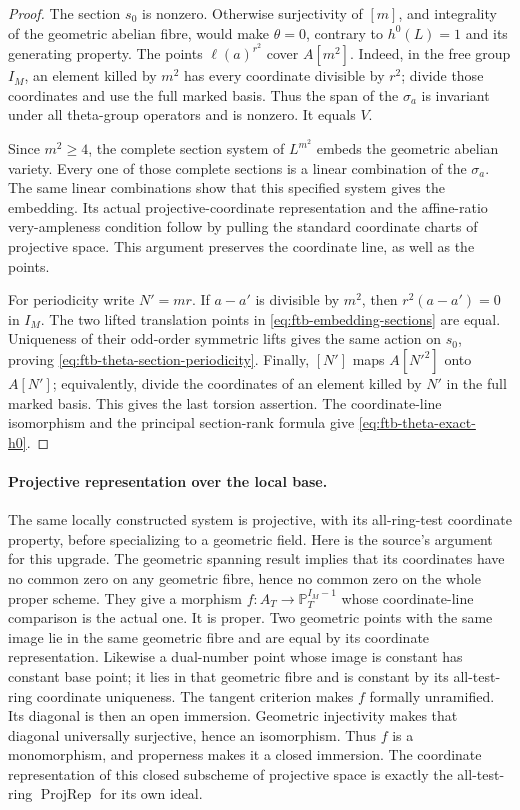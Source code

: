 \begin{proof}
The section \(s_0\) is nonzero.
Otherwise surjectivity of \([m]\), and integrality of
the geometric abelian fibre, would make \(\theta=0\),
contrary to \(h^0(L)=1\) and its generating property.
The points \(\ell(a)^{r^2}\) cover \(A[m^2]\).
Indeed, in the free group \(I_M\), an element killed
by \(m^2\) has every coordinate divisible by \(r^2\);
divide those coordinates and use the full marked basis.
Thus the span of the \(\sigma_a\) is invariant under
all theta-group operators and is nonzero.
It equals \(V\).

Since \(m^2\ge4\), the complete section system of
\(L^{m^2}\) embeds the geometric abelian variety.
Every one of those complete sections is a linear
combination of the \(\sigma_a\).
The same linear combinations show that this specified
system gives the embedding.
Its actual projective-coordinate representation and
the affine-ratio very-ampleness condition follow by
pulling the standard coordinate charts of projective
space.
This argument preserves the coordinate line, as well
as the points.

For periodicity write \(N'=mr\).
If \(a-a'\) is divisible by \(m^2\), then
\(r^2(a-a')=0\) in \(I_M\).
The two lifted translation points in
\eqref{eq:ftb-embedding-sections} are equal.
Uniqueness of their odd-order symmetric lifts gives
the same action on \(s_0\), proving
\eqref{eq:ftb-theta-section-periodicity}.
Finally, \([N']\) maps \(A[N'^2]\) onto \(A[N']\);
equivalently, divide the coordinates of an element
killed by \(N'\) in the full marked basis.
This gives the last torsion assertion.
The coordinate-line isomorphism and the principal
section-rank formula give
\eqref{eq:ftb-theta-exact-h0}.
\end{proof}

\paragraph{Projective representation over the local base.}
The same locally constructed system is projective,
with its all-ring-test coordinate property, before
specializing to a geometric field.
Here is the source's argument for this upgrade.
The geometric spanning result implies that its
coordinates have no common zero on any geometric
fibre, hence no common zero on the whole proper scheme.
They give a morphism \(f:A_T\to\mathbb P_T^{I_M-1}\)
whose coordinate-line comparison is the actual one.
It is proper.
Two geometric points with the same image lie in the
same geometric fibre and are equal by its coordinate
representation.
Likewise a dual-number point whose image is constant
has constant base point; it lies in that geometric
fibre and is constant by its all-test-ring coordinate
uniqueness.
The tangent criterion makes \(f\) formally unramified.
Its diagonal is then an open immersion.
Geometric injectivity makes that diagonal universally
surjective, hence an isomorphism.
Thus \(f\) is a monomorphism, and properness makes it
a closed immersion.
The coordinate representation of this closed
subscheme of projective space is exactly the
all-test-ring \(\operatorname{ProjRep}\) for its
own ideal.

